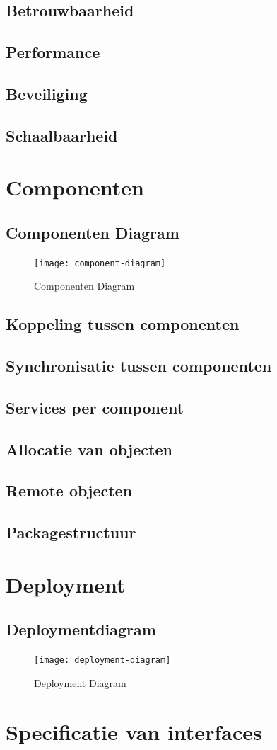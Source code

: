 \documentclass{scrreprt}
\begin{document}
	\section{Betrouwbaarheid}
	\section{Performance}
	\section{Beveiliging}
	\section{Schaalbaarheid}
	
	\newpage
	\chapter{Componenten}
	\section{Componenten Diagram}
	\begin{figure}[ht]
		\centering
		\texttt{[image: component-diagram]}
		\label{pic:component-diagram}
		\caption{Componenten Diagram}
	\end{figure}
	\section{Koppeling tussen componenten}
	\section{Synchronisatie tussen componenten}
	\section{Services per component}
	\section{Allocatie van objecten}
	\section{Remote objecten}
	\section{Packagestructuur}
	
	\newpage
	\chapter{Deployment}
	\section{Deploymentdiagram}
	\begin{figure}[ht]
		\centering
		\texttt{[image: deployment-diagram]}
		\label{pic:deployment-diagram}
		\caption{Deployment Diagram}
	\end{figure}
	
	\newpage
	\chapter{Specificatie van interfaces}
\end{document}
